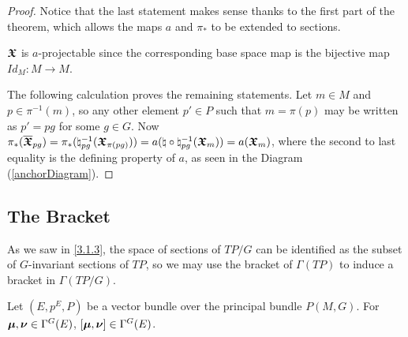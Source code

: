 \begin{proof}
Notice that the last statement makes sense thanks to the first part of the theorem, which allows the maps $a$ and $\pi_*$ to be extended to sections.%

$\bm{\mathfrak{X}}$ is $a$-projectable since the corresponding base space map is the bijective map $Id_M: M \to M$. 

The following calculation proves the remaining statements. Let $m \in M$ and $p \in \pi^{-1}(m)$, so any other element $p' \in P$ such that $m = \pi(p)$ may be written as $p' = pg$ for some $g \in G$. Now %
$\pi_*(\overline{\bm{\mathfrak{X}}}_{pg}) = \pi_*(\natural^{-1}_{pg}(\bm{\mathfrak{X}}_{\pi(pg)})) = a(\natural \circ \natural^{-1}_{pg}(\bm{\mathfrak{X}}_{m})) = a(\bm{\mathfrak{X}}_{m})$, where the second to last equality is the defining property of $a$, as seen in the Diagram (\ref{anchorDiagram}). 

\end{proof}

\subsection{The Bracket}

As we saw in \ref{3.1.3}, the space of sections of $TP/G$ can be identified as the subset of $G$-invariant sections of $TP$, so we may use the bracket of $\Gamma(TP)$ to induce a bracket in $\Gamma(TP/G)$.

\begin{proposition}
Let $(E, p^E, P)$ be a vector bundle over the principal bundle $P(M, G)$. For $\bm{\mu}, \bm{\nu} \in \Gamma^G(E)$, $[\bm{\mu}, \bm{\nu}] \in \Gamma^G(E)$.
\end{proposition}

